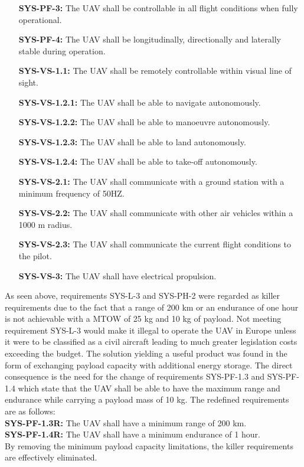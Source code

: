 \begin{enumerate}[leftmargin =4.5cm, align=parleft, labelwidth=10em]
    \item[\textbf{SYS-PF-3:}] The UAV shall be controllable in all flight conditions when fully operational.
	\item[\textbf{SYS-PF-4:}] The UAV shall be longitudinally, directionally and laterally stable during operation.
    \item[\textbf{SYS-VS-1.1:}] The UAV shall be remotely controllable within visual line of sight.
    \item[\textbf{SYS-VS-1.2.1:}] The UAV shall be able to navigate  autonomously.
    \item[\textbf{SYS-VS-1.2.2:}] The UAV shall be able to manoeuvre autonomously.
    \item[\textbf{SYS-VS-1.2.3:}] The UAV shall be able to land autonomously.
    \item[\textbf{SYS-VS-1.2.4:}] The UAV shall be able to take-off autonomously.
	\item[\textbf{SYS-VS-2.1:}] The UAV shall communicate with a ground station with a minimum frequency of 50HZ.
	\item[\textbf{SYS-VS-2.2:}] The UAV shall communicate with other air vehicles within a 1000 m radius.
	\item[\textbf{SYS-VS-2.3:}] The UAV shall communicate the current flight conditions to the pilot.
	\item[\textbf{SYS-VS-3:}] The UAV shall have electrical propulsion.
\end{enumerate}

As seen above, requirements SYS-L-3 and SYS-PH-2 were regarded as killer requirements due to the fact that a range of 200 km or an endurance of one hour is not achievable with a MTOW of 25 kg and 10 kg of payload. Not meeting requirement SYS-L-3 would make it illegal to operate the UAV in Europe unless it were to be classified as a civil aircraft leading to much greater legislation costs exceeding the budget. The solution yielding a useful product was found in the form of exchanging payload capacity with additional energy storage. The direct consequence is the need for the change of requirements SYS-PF-1.3 and SYS-PF-1.4 which state that the UAV shall be able to have the maximum range and endurance while carrying a payload mass of 10 kg. The redefined requirements are as follows:\\

\noindent \textbf{SYS-PF-1.3R:} The UAV shall have a minimum range of 200 km.\\

\noindent \textbf{SYS-PF-1.4R:} The  UAV  shall  have  a  minimum  endurance  of  1  hour.\\

By removing the minimum payload capacity limitations, the killer requirements are effectively eliminated.